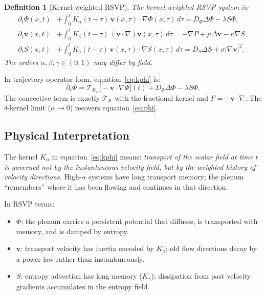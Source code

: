 \documentclass[12pt]{article}
\newtheorem{definition}[theorem]{Definition}
\newcommand{\TK}{\mathcal{T}_K}
\begin{document}
\begin{definition}[Kernel-weighted RSVP]
\label{def:krsvp}
The \emph{kernel-weighted RSVP system} is:
\begin{align}
  \partial_t\Phi(x,t) &+ \int_0^t K_\alpha(t-\tau)\,
    \mathbf{v}(x,\tau)\cdot\nabla\Phi(x,\tau)\, d\tau
    = D_\Phi\Delta\Phi - \lambda S\Phi, \label{eq:kphi} \\
  \partial_t\mathbf{v}(x,t) &+ \int_0^t K_\beta(t-\tau)\,
    (\mathbf{v}\cdot\nabla)\mathbf{v}(x,\tau)\, d\tau
    = -\nabla P + \mu\Delta\mathbf{v} - \kappa\nabla S, \label{eq:kv} \\
  \partial_t S(x,t) &+ \int_0^t K_\gamma(t-\tau)\,
    \mathbf{v}(x,\tau)\cdot\nabla S(x,\tau)\, d\tau
    = D_S\Delta S + \sigma|\nabla\mathbf{v}|^2. \label{eq:kS}
\end{align}
The orders $\alpha, \beta, \gamma \in (0,1)$ may differ by field.
\end{definition}

In trajectory-operator form, equation~\eqref{eq:kphi} is:
\[
  \partial_t\Phi = \mathcal{T}_{K_\alpha}\bigl[-\mathbf{v}\cdot\nabla\Phi\bigr](t)
  + D_\Phi\Delta\Phi - \lambda S\Phi.
\]
The convective term is exactly $\TK$ with the fractional kernel and
$F = -\mathbf{v}\cdot\nabla$. The $\delta$-kernel limit ($\alpha \to 0$)
recovers equation~\eqref{eq:phi}.

\subsection{Physical Interpretation}

The kernel $K_\alpha$ in equation~\eqref{eq:kphi} means: \textit{transport
of the scalar field at time $t$ is governed not by the instantaneous
velocity field, but by the weighted history of velocity directions.} High-$\alpha$
systems have long transport memory; the plenum ``remembers'' where it has
been flowing and continues in that direction.

In RSVP terms:
\begin{itemize}
  \item $\Phi$: the plenum carries a persistent potential that diffuses,
    is transported with memory, and is damped by entropy.
  \item $\mathbf{v}$: transport velocity has inertia encoded by $K_\beta$;
    old flow directions decay by a power law rather than instantaneously.
  \item $S$: entropy advection has long memory ($K_\gamma$); dissipation
    from past velocity gradients accumulates in the entropy field.
\end{itemize}
\end{document}
